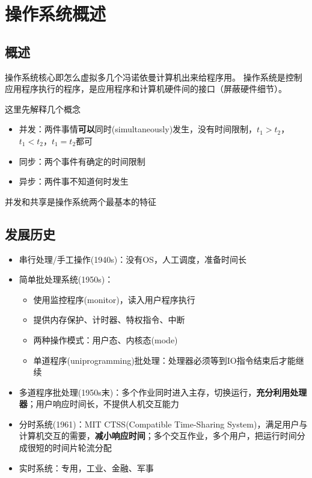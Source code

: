 
\section{操作系统概述}
\subsection{概述}
操作系统核心即怎么虚拟多几个冯诺依曼计算机出来给程序用。
操作系统是控制应用程序执行的程序，是应用程序和计算机硬件间的接口（屏蔽硬件细节）。

这里先解释几个概念
\begin{itemize}
	\item 并发：两件事情\textbf{可以}同时(simultaneously)发生，没有时间限制，$t_1>t_2$，$t_1<t_2$，$t_1=t_2$都可
	\item 同步：两个事件有确定的时间限制
	\item 异步：两件事不知道何时发生
\end{itemize}

并发和共享是操作系统两个最基本的特征


\subsection{发展历史}
\begin{itemize}
	\item 串行处理/手工操作(1940s)：没有OS，人工调度，准备时间长
	\item 简单批处理系统(1950s)：
	\begin{itemize}
		\item 使用监控程序(monitor)，读入用户程序执行
		\item 提供内存保护、计时器、特权指令、中断
		\item 两种操作模式：用户态、内核态(mode)
		\item 单道程序(uniprogramming)批处理：处理器必须等到IO指令结束后才能继续
	\end{itemize}
	\item 多道程序批处理(1950s末)：多个作业同时进入主存，切换运行，\textbf{充分利用处理器}；用户响应时间长，不提供人机交互能力
	\item 分时系统(1961)：MIT CTSS(Compatible Time-Sharing System)，满足用户与计算机交互的需要，\textbf{减小响应时间}；多个交互作业，多个用户，把运行时间分成很短的时间片轮流分配
	\item 实时系统：专用，工业、金融、军事
\end{itemize}

